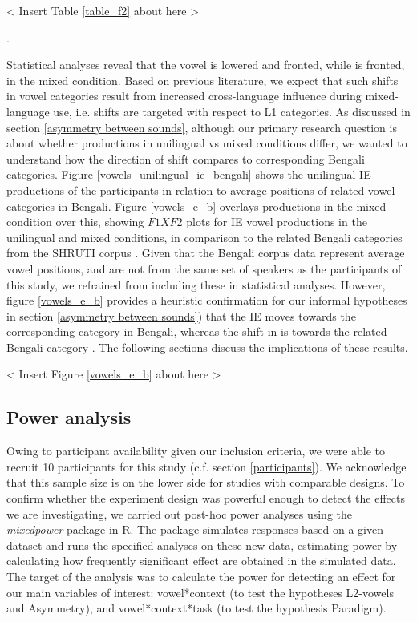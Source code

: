 \documentclass[12 pt]{article}
\newcommand{\nt}[1]{\textipa{[#1]}} %
\begin{document}
< Insert Table \ref{table_f2} about here >

.

Statistical analyses reveal that the vowel \nt{2} is lowered and fronted, while \nt{\ae} is fronted, in the mixed condition. Based on previous literature, we expect that such shifts in vowel categories result from increased cross-language influence during mixed-language use, i.e. shifts are targeted with respect to L1 categories. As discussed in section \ref{asymmetry between sounds}, although our primary research question is about whether productions in unilingual vs mixed conditions differ, we wanted to understand how the direction of shift compares to corresponding Bengali categories. Figure \ref{vowels_unilingual_ie_bengali} shows the unilingual IE productions of the participants in relation to average positions of related vowel categories in Bengali. Figure \ref{vowels_e_b} overlays productions in the mixed condition over this, showing $F1XF2$ plots for IE vowel productions in the unilingual and mixed conditions, in comparison to the related Bengali categories from the SHRUTI corpus \cite{shruticorpus}. Given that the Bengali corpus data represent average vowel positions, and are not from the same set of speakers as the participants of this study, we refrained from including these in statistical analyses. However, figure \ref{vowels_e_b} provides a heuristic confirmation for our informal hypotheses in section \ref{asymmetry between sounds}) that the IE \nt{\ae} moves towards the corresponding \nt{\ae} category in Bengali, whereas the shift in \nt{2} is towards the related Bengali category \nt{a:}. The following sections discuss the implications of these results.

< Insert Figure \ref{vowels_e_b} about here >

\subsection{Power analysis}
Owing to participant availability given our inclusion criteria, we were able to recruit 10 participants for this study (c.f. section \ref{participants}). We acknowledge that this sample size is on the lower side for studies with comparable designs. To confirm whether the experiment design was powerful enough to detect the effects we are investigating, we carried out post-hoc power analyses using the \textit{mixedpower} package \citep{kumle2021estimating} in R. The package simulates responses based on a given dataset and runs the specified analyses on these new data, estimating power by calculating how frequently significant effect are obtained in the simulated data. The target of the analysis was to calculate the power for detecting an effect for our main variables of interest: vowel*context (to test the hypotheses L2-vowels and Asymmetry), and vowel*context*task (to test the hypothesis Paradigm). 
\end{document}

